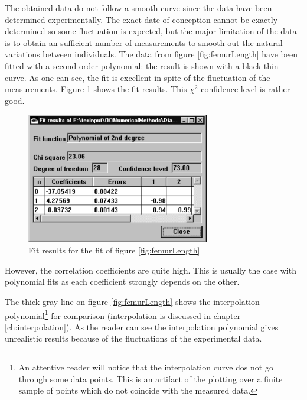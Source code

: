 The obtained data do not follow a smooth curve since the data have
been determined experimentally. The exact date of conception
cannot be exactly determined so some fluctuation is expected, but
the major limitation of the data is to obtain an sufficient number
of measurements to smooth out the natural variations between
individuals. The data from figure \ref{fig:femurLength} have been
fitted with a second order polynomial: the result is shown with a
black thin curve. As one can see, the fit is excellent in spite of
the fluctuation of the measurements. Figure
\ref{fig:femurLengthResults} shows the fit results. This $\chi^2$
confidence level is rather good.
\begin{figure}[h]
\centering\includegraphics[width=8cm]{Figures/PolFitResults}
\caption{Fit results for the fit of figure \ref{fig:femurLength}
}\label{fig:femurLengthResults}
\end{figure}
However, the correlation coefficients are quite high. This is
usually the case with polynomial fits as each coefficient strongly
depends on the other.

The thick gray line on figure \ref{fig:femurLength} shows the
interpolation polynomial\footnote{An attentive reader will notice
that the interpolation curve dos not go through some data points.
This is an artifact of the plotting over a finite sample of points
which do not coincide with the measured data.} for comparison
(interpolation is discussed in chapter \ref{ch:interpolation}). As
the reader can see the interpolation polynomial gives unrealistic
results because of the fluctuations of the experimental data.

